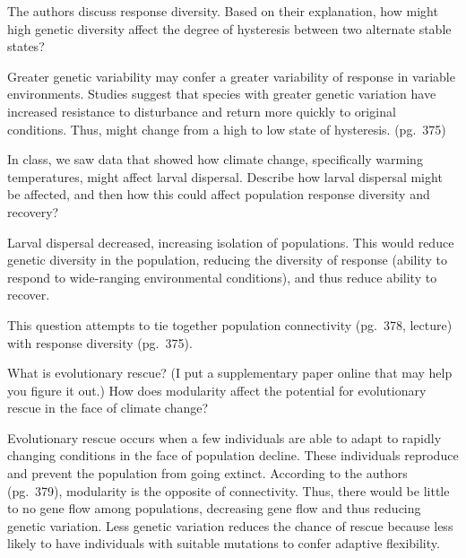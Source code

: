 \documentclass[12pt, addpoints]{exam}
\begin{document}
\begin{questions}

\question[5]
The authors discuss response diversity. Based on their explanation, how might 
high genetic diversity affect the degree of hysteresis between two alternate 
stable states?

\begin{solution}
Greater genetic variability may confer a greater variability of response in variable environments. Studies suggest that species with greater genetic variation have increased resistance to disturbance and return more quickly to original conditions. Thus, might change from a high to low state of hysteresis. (pg.~375)
\end{solution}

\question[5]
In class, we saw data that showed how climate change, specifically
warming temperatures, might affect larval dispersal. Describe how 
larval dispersal might be affected, and then how this could affect 
population response diversity and recovery?


\begin{solution}
	Larval dispersal decreased, increasing isolation of populations.
	This would reduce genetic diversity in the population, reducing
	the diversity of response (ability to respond to wide-ranging
	environmental conditions), and thus reduce ability to recover.
	
	This question attempts to tie together population connectivity (pg.~378, lecture) with response diversity (pg.~375).
\end{solution}

\question[5]
What is evolutionary rescue? (I put a supplementary paper online that may help you figure it out.) How does modularity affect the potential for evolutionary rescue in the face of climate change?


\begin{solution}
	Evolutionary rescue occurs when a few individuals are able 
	to adapt to rapidly changing conditions in the face of population 
	decline. These individuals reproduce and prevent the population 
	from going extinct. According to the authors (pg.~379), 
	modularity is the opposite of connectivity. Thus, there would be
	little to no gene flow among populations, decreasing gene flow and
	thus reducing genetic variation. Less genetic variation reduces the
	chance of rescue because less likely to have individuals with
	suitable mutations to confer adaptive flexibility.
\end{solution}



\end{questions}
\end{document}
